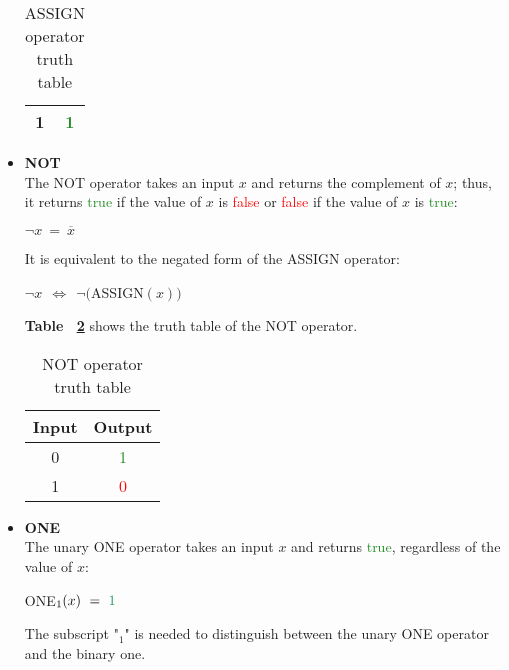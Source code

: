 \documentclass[]{usiinfbachelorproject}
\begin{document}
\begin{itemize}
\begin{table}[H]
\begin{tabular}{|c|c|}
                \hline
                1 & \textcolor{ForestGreen}{1} \\
                \hline
            \end{tabular}
            \caption{ASSIGN operator truth table}
            \label{tab:assign-table}
        \end{table}
    \item \textbf{NOT}
        \vspace{0.2cm} \\
        The NOT operator takes an input $x$ and returns the complement of $x$; thus, it returns \textcolor{ForestGreen}{true} if the value of $x$ is \textcolor{red}{false} or \textcolor{red}{false} if the value of $x$ is \textcolor{ForestGreen}{true}:
        \begin{center}
            $\neg x \ = \ \overline{x}$
        \end{center}
        It is equivalent to the negated form of the ASSIGN operator:
        \begin{center}
            $\neg x \ \ \Longleftrightarrow \ \ \neg($ASSIGN$(x))$
        \end{center}
        \textbf{Table ~\ref{tab:not-table}} shows the truth table of the NOT operator.
        \begin{table}[H]
            \centering
            \begin{tabular}{|c|c|}
                \hline
                \textbf{Input} & \textbf{Output} \\
                \hline
                0 & \textcolor{ForestGreen}{1} \\
                \hline
                1 & \textcolor{red}{0} \\
                \hline
            \end{tabular}
            \caption{NOT operator truth table}
            \label{tab:not-table}
        \end{table}
    \item \textbf{ONE}
        \vspace{0.2cm} \\
        The unary ONE operator takes an input $x$ and returns \textcolor{ForestGreen}{true}, regardless of the value of $x$:
        \begin{center}
            ONE$_1(x) \ = \ \textcolor{ForestGreen}{1}$
        \end{center}
        The subscript "$_1$" is needed to distinguish between the unary ONE operator and the binary one. \\

\end{itemize}
\end{document}
